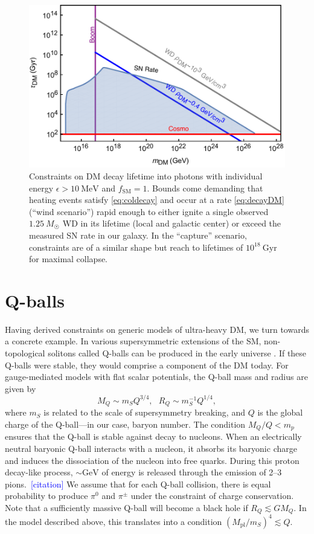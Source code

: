 \documentclass[twocolumn, preprintnumbers,amsmath,amssymb,prd, superscriptaddress]{revtex4}
\begin{document}
\begin{figure}
\includegraphics[scale=.45]{decayobservation.pdf}
\caption{Constraints on DM decay lifetime into photons with individual energy $\epsilon > 10~\text{MeV}$ and $f_\text{SM} = 1$. Bounds come demanding that heating events satisfy \eqref{eq:coldecay} and occur at a rate \eqref{eq:decayDM} (``wind scenario'') rapid enough to either ignite a single observed $1.25~M_{\astrosun}$ WD in its lifetime (local and galactic center) or exceed the measured SN rate in our galaxy. In the ``capture'' scenario, constraints are of a similar shape but reach to lifetimes of $10^{18}~\text{Gyr}$ for maximal collapse.}
\label{fig:decayclasses}
\end{figure}

\section{Q-balls}
\label{sec:QBalls}

Having derived constraints on generic models of ultra-heavy DM, we turn towards a concrete example.
In various supersymmetric extensions of the SM, non-topological solitons called Q-balls can be produced in the early universe \cite{Coleman:1985ki, Kusenko:1997si}.
If these Q-balls were stable, they would comprise a component of the DM today.
For gauge-mediated models with flat scalar potentials, the Q-ball mass and radius are given by
\begin{equation}
\label{eq:Qballprop}
M_Q \sim m_S Q^{3/4}, ~~~ R_Q \sim m_S^{-1} Q^{1/4},
\end{equation}
where $m_S$ is related to the scale of supersymmetry breaking, and $Q$ is the global charge of the Q-ball---in our case, baryon number.
The condition $M_Q/Q < m_p$ ensures that the Q-ball is stable against decay to nucleons.
When an electrically neutral baryonic Q-ball interacts with a nucleon, it absorbs its baryonic charge and induces the dissociation of the nucleon into free quarks.
During this proton decay-like process, $\sim \text{GeV}$ of energy is released through the emission of 2--3 pions.~\textcolor{blue}{[citation]}
We assume that for each Q-ball collision, there is equal probability to produce $\pi^0$ and $\pi^\pm$ under the constraint of charge conservation.
Note that a sufficiently massive Q-ball will become a black hole if $R_Q \lesssim G M_Q$.
In the model described above, this translates into a condition $(M_\text{pl}/m_S)^4 \lesssim Q$.
\end{document}
